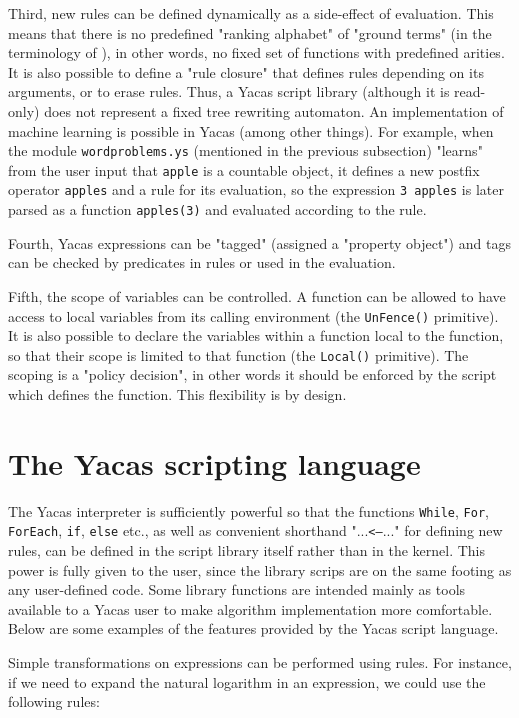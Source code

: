 \documentclass{llncs}
\begin{document}
Third, new rules can be defined dynamically as a side-effect of evaluation.
This means that there is no predefined "ranking alphabet" of "ground terms" (in
the terminology of \cite{TATA99}), in other words, no fixed set of functions with
predefined arities. It is also possible to define a "rule closure" that defines
rules depending on its arguments, or to erase rules. Thus, a Yacas script
library (although it is read-only) does not represent a fixed tree rewriting
automaton. An implementation of machine learning is possible in Yacas (among
other things). For example, when the module \texttt{wordproblems.ys} (mentioned in the previous subsection) "learns" from the
user input that \texttt{apple} is a countable object, it defines a new postfix
operator \texttt{apples} and a rule for its evaluation, so the expression \texttt{3 apples} is later parsed as a
function \texttt{apples(3)} and evaluated according to the rule.


Fourth, Yacas expressions can be "tagged" (assigned a "property object") and
tags can be checked by predicates in rules or used in the evaluation.


Fifth, the scope of variables can be controlled. A function can be allowed to
have  access to local variables from its calling environment (the \texttt{UnFence()}
primitive). It is also possible to declare the variables within a  function
local to the function, so that their scope is limited to that function (the
\texttt{Local()} primitive).  The scoping is a "policy decision", in other words it
should be enforced by the script which  defines the function. This
flexibility is by design.


\section{The Yacas scripting language}
The Yacas interpreter is sufficiently powerful so that the functions \texttt{While},
\texttt{For}, \texttt{ForEach}, \texttt{if}, \texttt{else} etc., as well as convenient shorthand
"...\texttt{<--}..." for defining new rules, can be defined in the script library
itself rather than in the kernel. This power is fully given to the user, since
the library scrips are on the same footing as any user-defined code. Some
library functions are intended mainly as tools available to a Yacas user to
make algorithm implementation more comfortable. Below are some examples of the features provided by the Yacas script language.


Simple transformations on expressions can be performed using
rules. For instance, if we need to expand the natural logarithm in an expression, we could use the
following rules:
\end{document}
